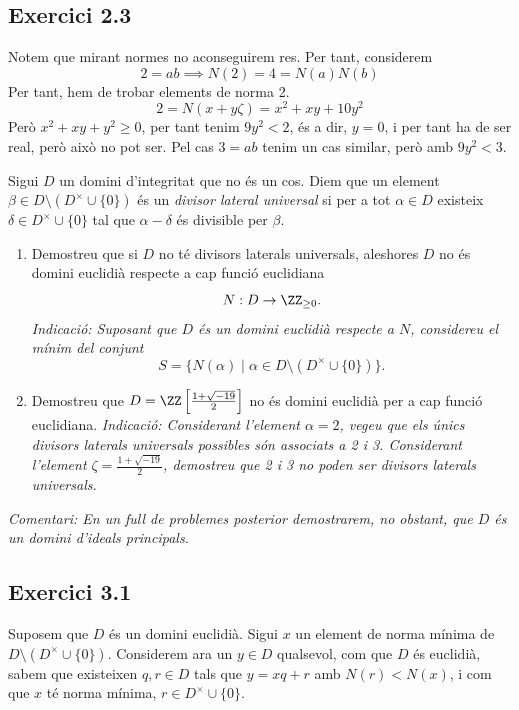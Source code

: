 \documentclass[11pt, a4paper]{article}
\begin{document}
    \subsection{Exercici 2.3}
    Notem que mirant normes no aconseguirem res. Per tant, considerem
    \[
        2=ab\implies N(2)=4=N(a)N(b)
    \]
    Per tant, hem de trobar elements de norma 2.
    \[
        2=N(x+y\zeta)=x^2+xy+10y^2
    \]
    Però $x^2+xy+y^2\geq0$, per tant tenim $9y^2<2$, és a dir, $y=0$, i per tant ha de ser real, però això no pot ser. Pel cas $3=ab$ tenim un cas similar, però amb $9y^2<3$.
    \newpage
    \begin{tcolorbox}[title=\section{FP 2 Exercici 3}]
        Sigui $D$ un domini d'integritat que no és un cos. Diem que un element $\beta\in D\setminus(D^\times\cup\{0\})$ és un \textit{divisor lateral universal} si per a tot $\alpha\in D$ existeix $\delta\in D^\times\cup\{0\}$ tal que $\alpha-\delta$ és divisible per $\beta$.
        \begin{enumerate}
            \item Demostreu que si $D$ no té divisors laterals universals, aleshores $D$ no és domini euclidià respecte a cap funció euclidiana
            \[
                N:D\to\ZZ_{\geq0}.
            \]
            \textit{Indicació: Suposant que $D$ és un domini euclidià respecte a $N$, considereu el mínim del conjunt \[S=\{N(\alpha)\mid\alpha\in D\setminus(D^\times\cup\{0\})\}.\]}
            \item Demostreu que $D=\ZZ\left[\frac{1+\sqrt{-19}}{2}\right]$ no és domini euclidià per a cap funció euclidiana.
            \textit{Indicació: Considerant l'element $\alpha=2$, vegeu que els únics divisors laterals universals possibles són associats a 2 i 3. Considerant l'element $\zeta=\frac{1+\sqrt{-19}}{2}$, demostreu que 2 i 3 no poden ser divisors laterals universals.}\par
        \end{enumerate}
        \textit{Comentari: En un full de problemes posterior demostrarem, no obstant, que $D$ és un domini d'ideals principals.} 
    \end{tcolorbox}
    \subsection{Exercici 3.1}
    Suposem que $D$ és un domini euclidià. Sigui $x$ un element de norma mínima de $D\setminus(D^\times\cup\{0\})$. Considerem ara un $y\in D$ qualsevol, com que $D$ és euclidià, sabem que existeixen $q,r\in D$ tals que $y=xq+r$ amb $N(r)<N(x)$, i com que $x$ té norma mínima, $r\in D^\times\cup\{0\}$.
\end{document}
